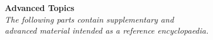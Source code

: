 
\appendix

\cleardoublepage
\thispagestyle{empty}
\vspace*{\fill}
\begin{center}
  {\Huge\bfseries Advanced Topics}\\[2ex]
  {\large\itshape The following parts contain supplementary and\\
  advanced material intended as a reference encyclopaedia.}
\end{center}
\vspace*{\fill}
\tocdivider
{}
\cleardoublepage














